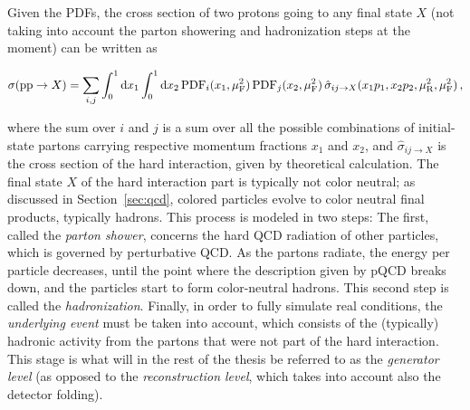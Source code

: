 Given the PDFs, the cross section of two protons going to any final state $X$ (not taking into account the parton showering and hadronization steps at the moment) can be written as
% 
\begin{linenomath*}
\begin{equation}
\sigma(\mathrm{p}\mathrm{p}\to X)
= \sum_{i,j} \int_0^1 \textrm{d}x_1 \int_0^1 \textrm{d}x_2
    \, \text{PDF}_i(x_1,\mu_\mathrm{F}^2) \, \text{PDF}_j(x_2,\mu_\mathrm{F}^2)
    \, \hat{\sigma}_{ij\to X}(x_1 p_1, x_2 p_2, \mu_\mathrm{R}^2, \mu_\mathrm{F}^2)
\,,
\end{equation}
\end{linenomath*}
% 
where the sum over $i$ and $j$ is a sum over all the possible combinations of initial-state partons carrying respective momentum fractions $x_1$ and $x_2$, and $\hat{\sigma}_{ij\to X}$ is the cross section of the hard interaction, given by theoretical calculation.
% 
The final state $X$ of the hard interaction part is typically not color neutral; as discussed in Section~\ref{sec:qcd}, colored particles evolve to color neutral final products, typically hadrons.
% 
This process is modeled in two steps: The first, called the \textit{parton shower}, concerns the hard QCD radiation of other particles, which is governed by perturbative QCD.
% 
As the partons radiate, the energy per particle decreases, until the point where the description given by pQCD breaks down, and the particles start to form color-neutral hadrons.
% 
This second step is called the \textit{hadronization}.
% 
Finally, in order to fully simulate real conditions, the \textit{underlying event} must be taken into account, which consists of the (typically) hadronic activity from the partons that were not part of the hard interaction.
% 
This stage is what will in the rest of the thesis be referred to as the \textit{generator level} (as opposed to the \textit{reconstruction level}, which takes into account also the detector folding).


